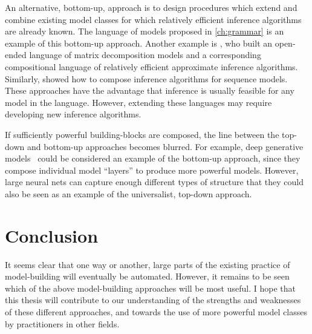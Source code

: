 An alternative, bottom-up, approach is to design procedures which extend and combine existing model classes for which relatively efficient inference algorithms are already known.
The language of models proposed in \cref{ch:grammar} is an example of this bottom-up approach.
Another example is \citet{roger-grosse-thesis}, who built an open-ended language of matrix decomposition models and a corresponding compositional language of relatively efficient approximate inference algorithms.
Similarly, \citet{christian-thesis} showed how to compose inference algorithms for sequence models.
These approaches have the advantage that inference is usually feasible for any model in the language.
However, extending these languages may require developing new inference algorithms.

If sufficiently powerful building-blocks are composed, the line between the top-down and bottom-up approaches becomes blurred.
For example, deep generative models~\citep{adams2010learning,damianou2012deep,rippel2013high,bengio2013generalized,salakhutdinov2009deep} could be considered an example of the bottom-up approach, since they compose individual model ``layers'' to produce more powerful models.
However, large neural nets can capture enough different types of structure that they could also be seen as an example of the universalist, top-down approach.

\section{Conclusion}
It seems clear that one way or another, large parts of the existing practice of model-building will eventually be automated.
However, it remains to be seen which of the above model-building approaches will be most useful.
I hope that this thesis will contribute to our understanding of the strengths and weaknesses of these different approaches, and towards the use of more powerful model classes by practitioners in other fields.






